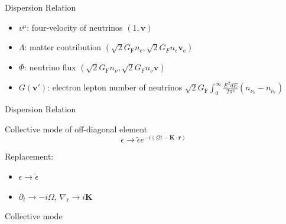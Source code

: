 \documentclass[9pt]{beamer}
\begin{document}
\begin{darkframes}
\begin{frame}{Dispersion Relation}
\pause

\begin{itemize}
    \item \colorbox{blue!50}{$ v^\mu$}:  four-velocity of neutrinos $(1, \boldsymbol v) $
    \item \colorbox{red!50}{$\Lambda$}: matter contribution $( \sqrt{2}G_{\mathrm F} n_{\mathrm e}, \sqrt{2}G_F n_e \boldsymbol v_{\mathrm e} )$
    \item \colorbox{ao!60}{$\Phi$}: neutrino flux $( \sqrt{2}G_{\mathrm F} n_{\nu}, \sqrt{2}G_F n_\nu \boldsymbol v )$
    \item \colorbox{armygreen!70}{$G(\mathbf v')$}: electron lepton number of neutrinos $\sqrt{2}G_{\mathrm F} \int_0^\infty \frac{E^2 dE}{2\pi^2} \left( n_{\nu_{\mathrm e}} - n_{\bar\nu_{\mathrm e}} \right)$
\end{itemize}



\end{frame}

\begin{frame}{Dispersion Relation}

\begin{tcolorbox}[standard jigsaw, opacityback=0]
    \color{white}
    Collective mode of off-diagonal element
\begin{equation*}
    \epsilon \to \tilde \epsilon e^{-i(\Omega t - \boldsymbol{ K}\cdot \boldsymbol{r} )}
\end{equation*}
\end{tcolorbox}

\pause

Replacement:
\begin{itemize}
    \item $\epsilon \to \tilde \epsilon$
    \item $\partial_t \to -i\Omega$, $\nabla_{\boldsymbol{r}}\to i \boldsymbol{K}$
\end{itemize}

\pause

\begin{tcolorbox}[standard jigsaw, opacityback=0]
    \color{white}
Collective mode




\end{tcolorbox}
\end{frame}
\end{darkframes}
\end{document}
